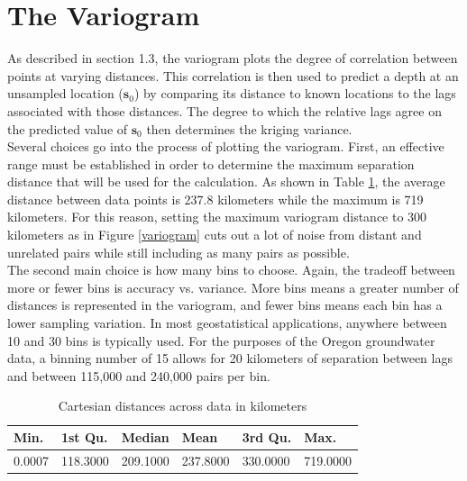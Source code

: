 \documentclass[12pt,twoside]{reedthesis}
\begin{document}
\section{The Variogram}


As described in section 1.3, the variogram plots the degree of correlation between points at varying distances. This correlation is then used to predict a depth at an unsampled location ($\mathbf{s}_0$) by comparing its distance to known locations to the lags associated with those distances. The degree to which the relative lags agree on the predicted value of $\mathbf{s}_0$ then determines the kriging variance. \\

Several choices go into the process of plotting the variogram. First, an effective range must be established in order to determine the maximum separation distance that will be used for the calculation. As shown in Table \ref{dists}, the average distance between data points is 237.8 kilometers while the maximum is 719 kilometers. For this reason, setting the maximum variogram distance to 300 kilometers as in Figure \ref{variogram} cuts out a lot of noise from distant and unrelated pairs while still including as many pairs as possible. \\

The second main choice is how many bins to choose. Again, the tradeoff between more or fewer bins is accuracy vs. variance. More bins means a greater number of distances is represented in the variogram, and fewer bins means each bin has a lower sampling variation. In most geostatistical applications, anywhere between 10 and 30 bins is typically used. For the purposes of the Oregon groundwater data, a binning number of 15 allows for 20 kilometers of separation between lags and between 115,000 and 240,000 pairs per bin. \\

\begin{table}[h]

\centering

\begin{tabular}{l|l|l|l|l|l}

\hline
Min.  & 1st Qu.  & Median  &   Mean  & 3rd Qu.  &   Max. \\
\hline
  0.0007 & 118.3000 & 209.1000 & 237.8000 & 330.0000 & 719.0000 \\
\hline

\end{tabular}

\caption{Cartesian distances across data in kilometers}
\label{dists}

\end{table}
	
\end{document}

